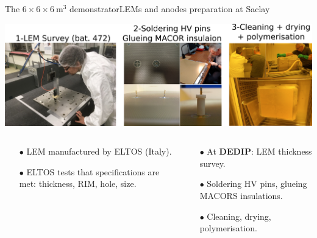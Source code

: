 \documentclass[10pt]{beamer}
\begin{document}
    \begin{frame}{The \texorpdfstring{$6 \times 6 \times \SI{6}{\meter\cubed}$}{666} demonstrator}{LEMs and anodes preparation at Saclay}
    	\begin{scriptsize}
    		\begin{center}
		    	\includegraphics[width=\textwidth]{figures/666/pretest.png}
	    	\end{center}
	    	\begin{columns}
	    		\begin{column}{0.5\textwidth}
	    			\begin{itemize}
	    				\item[$\bullet$] LEM manufactured by ELTOS (Italy).
	    				\item[$\bullet$] ELTOS tests that specifications are met: thickness, RIM, hole, size.
	    			\end{itemize}
	    		\end{column}\hfill
	    		\begin{column}{0.5\textwidth}
	    			\begin{itemize}
	    				\item[$\bullet$] At \textbf{DEDIP}: LEM thickness survey.
	    				\item[$\bullet$] Soldering HV pins, glueing MACORS insulations.
	    				\item[$\bullet$] Cleaning, drying, polymerisation.
	    			\end{itemize}
	    		\end{column}
	    	\end{columns}
	    \end{scriptsize} 
    \end{frame}
    
\end{document}
